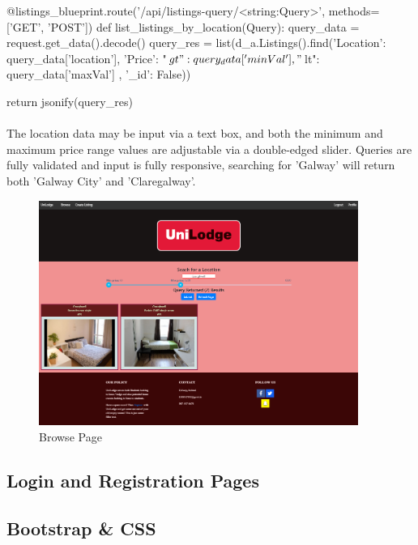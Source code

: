 \begin{python}[caption=Querying Specific Listings]
@listings_blueprint.route('/api/listings-query/<string:Query>', methods=['GET', 'POST'])
def list_listings_by_location(Query):
    query_data = request.get_data().decode()
    query_res = list(d_a.Listings().find({'Location': query_data['location'], 'Price': {"$gt": query_data['minVal'], "$lt": query_data['maxVal']} }, {'_id': False}))

    return jsonify(query_res)
\end{python}

\paragraph{}
The location data may be input via a text box, and both the minimum and maximum price range values are adjustable via a double-edged slider. Queries are fully validated and input is fully responsive, searching for 'Galway' will return both 'Galway City' and 'Claregalway'.

\begin{figure}[H]
	\caption{Browse Page}
	\label{image:browse}
	\centering
	\includegraphics[width=0.93\textwidth]{images/browse.png}
\end{figure}

\subsection{Login and Registration Pages}


\subsection{Bootstrap \& CSS}


